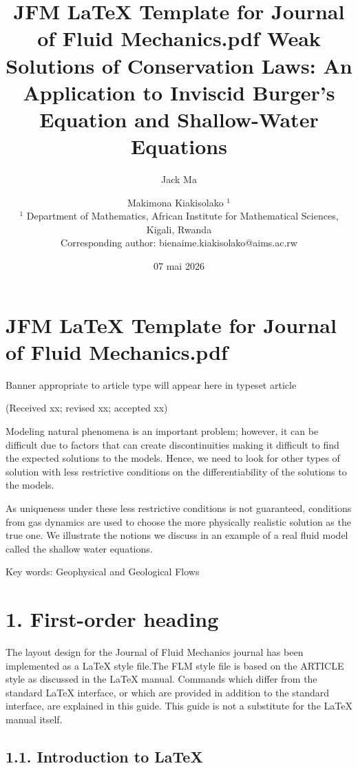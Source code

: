 \documentclass[12pt,a4paper]{article}
\title{JFM   LaTeX Template for Journal of Fluid Mechanics.pdf}
\author{Jack Ma}
\date{07 mai 2026}
\begin{document}
\maketitle

\section*{JFM   LaTeX Template for Journal of Fluid Mechanics.pdf}
Banner appropriate to article type will appear here in typeset article

\title{
Weak Solutions of Conservation Laws: An Application to Inviscid Burger's Equation and Shallow-Water Equations
}

\author{
Makimona Kiakisolako \({ }^{1}\) \\ \({ }^{1}\) Department of Mathematics, African Institute for Mathematical Sciences, Kigali, Rwanda \\ Corresponding author: bienaime.kiakisolako@aims.ac.rw
}
(Received xx; revised xx; accepted xx)

Modeling natural phenomena is an important problem; however, it can be difficult due to factors that can create discontinuities making it difficult to find the expected solutions to the models. Hence, we need to look for other types of solution with less restrictive conditions on the differentiability of the solutions to the models.

As uniqueness under these less restrictive conditions is not guaranteed, conditions from gas dynamics are used to choose the more physically realistic solution as the true one. We illustrate the notions we discuss in an example of a real fluid model called the shallow water equations.

Key words: Geophysical and Geological Flows

\section*{1. First-order heading}

The layout design for the Journal of Fluid Mechanics journal has been implemented as a LaTeX style file.The FLM style file is based on the ARTICLE style as discussed in the LaTeX manual. Commands which differ from the standard LaTeX interface, or which are provided in addition to the standard interface, are explained in this guide. This guide is not a substitute for the LaTeX manual itself.

\subsection*{1.1. Introduction to LaTeX}
\end{document}
